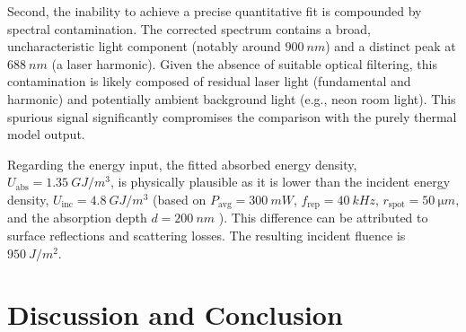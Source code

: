 \documentclass[
	a4paper,
]{scrarticle}
\begin{document}
Second, the inability to achieve a precise quantitative fit is compounded by spectral contamination. The corrected spectrum contains a broad, uncharacteristic light component (notably around $\SI{900}{nm}$) and a distinct peak at $\SI{688}{nm}$ (a laser harmonic). Given the absence of suitable optical filtering, this contamination is likely composed of residual laser light (fundamental and harmonic) and potentially ambient background light (e.g., neon room light). This spurious signal significantly compromises the comparison with the purely thermal model output.

Regarding the energy input, the fitted absorbed energy density, $U_{\text{abs}} = \SI{1.35}{GJ/m^3}$, is physically plausible as it is lower than the incident energy density, $U_{\text{inc}} = \SI{4.8}{GJ/m^3}$ (based on $P_{\text{avg}}=\SI{300}{mW}$, $f_{\text{rep}}=\SI{40}{kHz}$, $r_{\text{spot}}=\SI{50}{\micro m}$, and the absorption depth $d=\SI{200}{nm}$ \cite{smauszDeterminationUVVisible2017}). This difference can be attributed to surface reflections and scattering losses. The resulting incident fluence is $\SI{950}{J/m^2}$.


\section{Discussion and Conclusion}

\clearpage
\printbibliography
\end{document}
